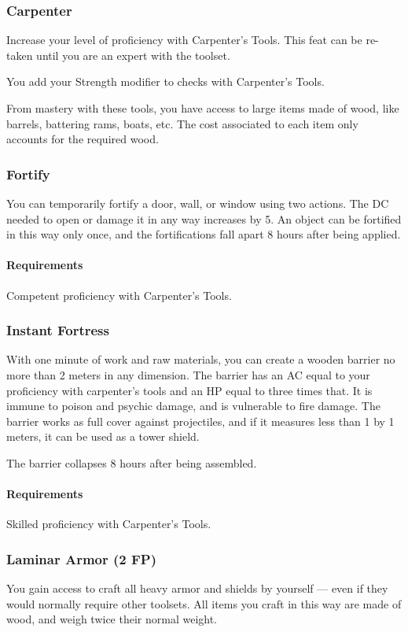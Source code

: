 \subsubsection{Carpenter} \label{feat::carpenter}
    Increase your level of proficiency with Carpenter's Tools.
    This feat can be re-taken until you are an expert with the toolset.

    You add your Strength modifier to checks with Carpenter's Tools.

    From mastery with these tools, you have access to large items made of wood, like barrels, battering rams, boats, etc.
    The cost associated to each item only accounts for the required wood.
\subsubsection{Fortify} \label{feat::fortify}
    You can temporarily fortify a door, wall, or window using two actions.
    The DC needed to open or damage it in any way increases by 5.
    An object can be fortified in this way only once, and the fortifications fall apart 8 hours after being applied.
    \paragraph{Requirements} Competent proficiency with Carpenter's Tools.
\subsubsection{Instant Fortress} \label{feat::instantfortress}
    With one minute of work and raw materials, you can create a wooden barrier no more than 2 meters in any dimension.
    The barrier has an AC equal to your proficiency with carpenter's tools and an HP equal to three times that.
    It is immune to poison and psychic damage, and is vulnerable to fire damage.
    The barrier works as full cover against projectiles, and if it measures less than 1 by 1 meters, it can be used as a tower shield.

    The barrier collapses 8 hours after being assembled.
    \paragraph{Requirements} Skilled proficiency with Carpenter's Tools.
\subsubsection{Laminar Armor (2 FP)} \label{feat::laminararmor}
    You gain access to craft all heavy armor and shields by yourself --- even if they would normally require other toolsets.
    All items you craft in this way are made of wood, and weigh twice their normal weight.

